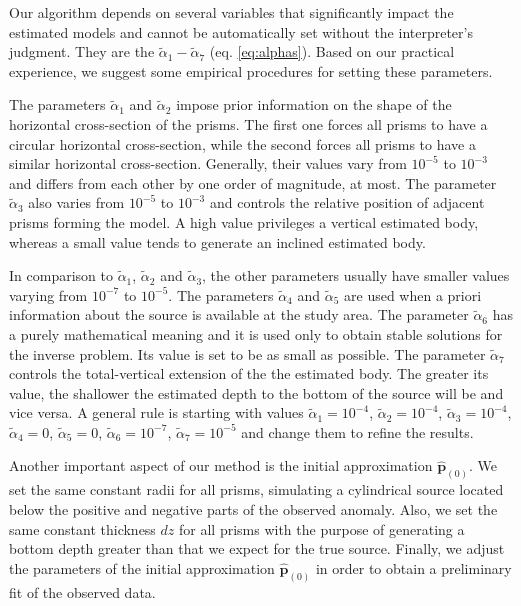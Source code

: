 Our algorithm depends on several variables that significantly impact the estimated models 
and cannot be automatically set without the interpreter’s judgment. They are the $\tilde{\alpha}_1 - \tilde{\alpha}_7$ (eq. \ref{eq:alphas}). 
Based on our practical experience, we suggest some 
empirical procedures for setting these parameters.

The parameters $\tilde{\alpha}_1$ and $\tilde{\alpha}_2$ impose prior information on the 
shape of the horizontal cross-section of the prisms. 
The first one forces all prisms to have a circular horizontal cross-section, while 
the second forces all prisms to have a similar horizontal cross-section.
Generally, their values vary from $10^{-5}$ to $10^{-3}$ and differs from
each other by one order of magnitude, at most.
The parameter $\tilde{\alpha}_3$ also varies from $10^{-5}$ to $10^{-3}$ and 
controls the relative position of adjacent prisms forming the model.
A high value privileges a vertical estimated body, whereas a small value 
tends to generate an inclined estimated body.

In comparison to $\tilde{\alpha}_1$, $\tilde{\alpha}_2$ and $\tilde{\alpha}_3$,
the other parameters usually have smaller values varying from $10^{-7}$ to $10^{-5}$.
The parameters $\tilde{\alpha}_4$ and $\tilde{\alpha}_5$ are used when a priori
information about the source is available at the study area.
The parameter $\tilde{\alpha}_6$ has a purely mathematical meaning and it is 
used only to obtain stable solutions for the inverse problem.
Its value is set to be as small as possible.
The parameter $\tilde{\alpha}_7$ controls the total-vertical extension of the 
the estimated body. 
The greater its value, the shallower the estimated depth to the bottom of the source will be 
and vice versa.
A general rule is starting with values 
$\tilde{\alpha}_1 = 10^{-4}$, $\tilde{\alpha}_2 = 10^{-4}$, $\tilde{\alpha}_3 = 10^{-4}$,
$\tilde{\alpha}_4 = 0$, $\tilde{\alpha}_5 = 0$, $\tilde{\alpha}_6 = 10^{-7}$, 
$\tilde{\alpha}_7 = 10^{-5}$ and change them to refine the results.

Another important aspect of our method is the initial approximation $\hat{\mathbf{p}}_{(0)}$. 
We set the same constant radii for all prisms, simulating a cylindrical source located below 
the positive and negative parts of the observed anomaly.
Also, we set the same constant thickness $dz$ for all prisms with the purpose 
of generating a bottom depth greater than that we expect for the true source.
Finally, we adjust the parameters of the initial approximation $\hat{\mathbf{p}}_{(0)}$ 
in order to obtain a preliminary fit of the observed data.
